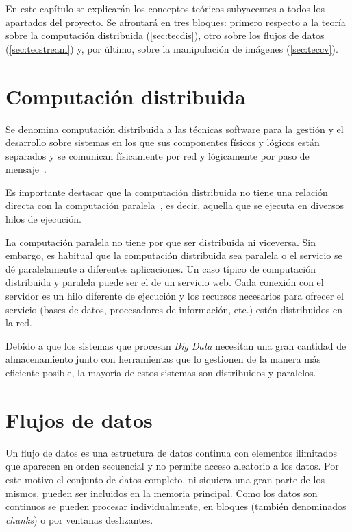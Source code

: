 

En este capítulo se explicarán los conceptos teóricos subyacentes a todos los apartados del proyecto. Se afrontará en tres bloques: primero respecto a la teoría sobre la computación distribuida (\autoref{sec:tecdis}), otro sobre los flujos de datos (\autoref{sec:tecstream}) y,  por último, sobre la manipulación de imágenes (\autoref{sec:teccv}).

\section{Computación distribuida}\label{sec:tecdis}

Se denomina computación distribuida a las técnicas software para la gestión y el desarrollo sobre sistemas en los que sus componentes físicos y lógicos están separados y se comunican físicamente por red y lógicamente por paso de mensaje~\cite{wiki:computaciondistribuida}.

Es importante destacar que la computación distribuida no tiene una relación directa con la computación paralela~\cite{christos1994computational}, es decir, aquella que se ejecuta en diversos hilos de ejecución. 

La computación paralela no tiene por que ser distribuida ni viceversa. Sin embargo, es habitual que la computación distribuida sea paralela o el servicio se dé paralelamente a diferentes aplicaciones. Un caso típico de computación distribuida y paralela puede ser el de un servicio web. Cada conexión con el servidor es un hilo diferente de ejecución y los recursos necesarios para ofrecer el servicio (bases de datos, procesadores de información, etc.) estén distribuidos en la red.

Debido a que los sistemas que procesan \textit{Big Data} necesitan una gran cantidad de almacenamiento junto con herramientas que lo gestionen de la manera más eficiente posible, la mayoría de estos sistemas son distribuidos y paralelos.


\section{Flujos de datos}\label{sec:tecstream}

Un flujo de datos es una estructura de datos continua con elementos ilimitados que aparecen en orden secuencial y no permite acceso aleatorio a los datos. Por este motivo el conjunto de datos completo, ni siquiera una gran parte de los mismos, pueden ser incluidos en la memoria principal. Como los datos son continuos se pueden procesar individualmente, en bloques (también denominados \textit{chunks}) o por ventanas deslizantes.


